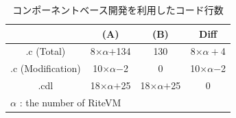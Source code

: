 \documentclass[submit,techrep]{ipsj}
\begin{document}
\begin{table}[t]
    \centering
    \caption{コンポーネントベース開発を利用したコード行数} 
    \begin{tabular}{c||cc|c}
                & (A)       & (B)     & Diff  \\ \hline
        .c (Total)      & 8$\times$$\alpha$$+$134  & 130     & 8$\times$$\alpha+$4\\
        .c (Modification)   & 10$\times\alpha$$-$2 & 0   &  10$\times\alpha$$-$2 \\
        .cdl    & 18$\times$$\alpha$$+$25   & 18$\times$$\alpha$$+$25 & 0     \\
        \multicolumn{3}{l}{{\small $\alpha$} : {\scriptsize the number of RiteVM}}
    \end{tabular}
    \vspace{-3mm}
    \label{tab:codesize}
\end{table}

\vspace{-2mm}
\end{document}
